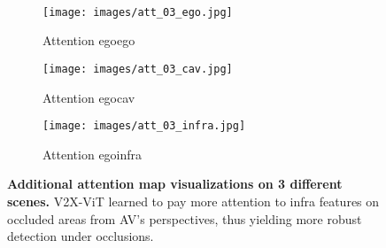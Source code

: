 \documentclass[runningheads]{llncs}
\begin{document}
\begin{figure}[!tb]
\begin{subfigure}[b]{\xxwidth\textwidth}
     \end{subfigure}
     \\
     \begin{subfigure}[b]{\xwidth\textwidth}
         \centering
         \texttt{[image: images/att\_03\_ego.jpg]}
         \caption{Attention egoego}
         \label{fig:att_ego3}
     \end{subfigure}
     \begin{subfigure}[b]{\xwidth\textwidth}
         \centering
         \texttt{[image: images/att\_03\_cav.jpg]}
         \caption{Attention egocav}
         \label{fig:att_cav3}
     \end{subfigure}
     \begin{subfigure}[b]{\xwidth\textwidth}
         \centering
         \texttt{[image: images/att\_03\_infra.jpg]}
         \caption{Attention egoinfra}
         \label{fig:att_infra3}
     \end{subfigure}
     \caption{\textbf{Additional attention map visualizations on 3 different scenes.} V2X-ViT learned to pay more attention to infra features on occluded areas from AV's perspectives, thus yielding more robust detection under occlusions.}
     \label{fig:sup-infra}
\end{figure}


\clearpage


\end{document}
